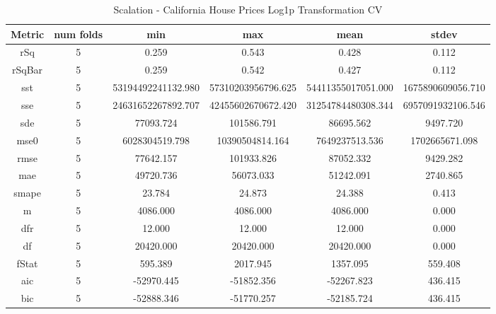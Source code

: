 \documentclass{article}
\begin{document}
\begin{table}[H]
\centering
\caption{Scalation - California House Prices Log1p Transformation CV}
\label{tab:Scalation - House Prices Log1p Transformation CV}
\begin{tabular}{|c|c|c|c|c|c|}\hline
Metric & num folds & min & max & mean & stdev \\ \hline \hline
rSq & 5 & 0.259 & 0.543 & 0.428 & 0.112 \\ \hline
rSqBar & 5 & 0.259 & 0.542 & 0.427 & 0.112 \\ \hline
sst & 5 & 53194492241132.980 & 57310203956796.625 & 54411355017051.000 & 1675890609056.710 \\ \hline
sse & 5 & 24631652267892.707 & 42455602670672.420 & 31254784480308.344 & 6957091932106.546 \\ \hline
sde & 5 & 77093.724 & 101586.791 & 86695.562 & 9497.720 \\ \hline
mse0 & 5 & 6028304519.798 & 10390504814.164 & 7649237513.536 & 1702665671.098 \\ \hline
rmse & 5 & 77642.157 & 101933.826 & 87052.332 & 9429.282 \\ \hline
mae & 5 & 49720.736 & 56073.033 & 51242.091 & 2740.865 \\ \hline
smape & 5 & 23.784 & 24.873 & 24.388 & 0.413 \\ \hline
m & 5 & 4086.000 & 4086.000 & 4086.000 & 0.000 \\ \hline
dfr & 5 & 12.000 & 12.000 & 12.000 & 0.000 \\ \hline
df & 5 & 20420.000 & 20420.000 & 20420.000 & 0.000 \\ \hline
fStat & 5 & 595.389 & 2017.945 & 1357.095 & 559.408 \\ \hline
aic & 5 & -52970.445 & -51852.356 & -52267.823 & 436.415 \\ \hline
bic & 5 & -52888.346 & -51770.257 & -52185.724 & 436.415 \\ \hline
\end{tabular}
\end{table}
\end{document}
